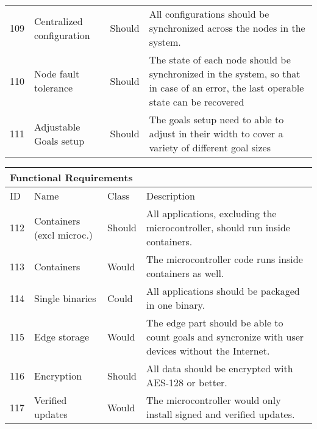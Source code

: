 \begin{table}[]
\begin{tabular}[t]{ l p{2.4cm} l p{7.6cm}}
        109 & Centralized configuration & Should         & All configurations should be synchronized across the nodes in the system.                                                          \\
        110 & Node fault tolerance      & Should         & The state of each node should be synchronized in the system, so that in case of an error, the last operable state can be recovered \\
        111 & Adjustable Goals setup    & Should         & The goals setup need to able to adjust in their width to cover a variety of different goal sizes                                   \\                  
        \end{tabular}\label{tab:funcReq}
    \end{table}
\begin{table}[]
    \begin{tabular}[t]{ l p{2.4cm} l p{7.6cm}}
        \multicolumn{4}{l}{Functional Requirements}                                                                                                                                           \\ \hline
        ID  & Name                      & Class & Description                                                                                                                        \\ \hline
        112 & Containers (excl microc.) & Should         & All applications, excluding the microcontroller, should run inside containers.                                                     \\      
        113 & Containers                & Would          & The microcontroller code runs inside containers as well.                                                                           \\
        114 & Single binaries           & Could          & All applications should be packaged in one binary.                                                                                 \\
        115 & Edge storage              & Would          & The edge part should be able to count goals and syncronize with user devices without the Internet.                                 \\
        116 & Encryption                & Should         & All data should be encrypted with AES-128 or better.                                                                               \\
        117 & Verified updates          & Would          & The microcontroller would only install signed and verified updates.                                                                \\                        
        \end{tabular}\label{tab:funcReq}
    \end{table}

